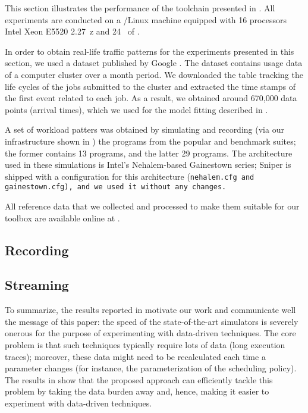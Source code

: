 This section illustrates the performance of the toolchain presented in
. All experiments are conducted on a /Linux machine
equipped with 16 processors Intel Xeon E5520 2.27~z and 24~ of
.

In order to obtain real-life traffic patterns for the experiments presented in
this section, we used a dataset published by Google \cite{google}. The dataset
contains usage data of a computer cluster over a month period. We downloaded the
table tracking the life cycles of the jobs submitted to the cluster and
extracted the time stamps of the first event related to each job. As a result,
we obtained around 670,000 data points (arrival times), which we used for the
model fitting described in .

A set of workload patters was obtained by simulating and recording (via our
infrastructure shown in ) the programs from the popular
 \cite{bienia2011} and  \cite{cpu2006} benchmark
suites; the former contains 13 programs, and the latter 29 programs. The
architecture used in these simulations is Intel's Nehalem-based Gainestown
series; Sniper is shipped with a configuration for this architecture
(\tt{nehalem.cfg} and \tt{gainestown.cfg}), and we used it without any changes.

All reference data that we collected and processed to make them suitable for our
toolbox are available online at \cite{sources}.

\subsection{Recording}


\subsection{Streaming}


To summarize, the results reported in  motivate our work and
communicate well the message of this paper: the speed of the state-of-the-art
simulators is severely onerous for the purpose of experimenting with data-driven
techniques. The core problem is that such techniques typically require lots of
data (long execution traces); moreover, these data might need to be recalculated
each time a parameter changes (for instance, the parameterization of the
scheduling policy). The results in  show that the proposed
approach can efficiently tackle this problem by taking the data burden away and,
hence, making it easier to experiment with data-driven techniques.
